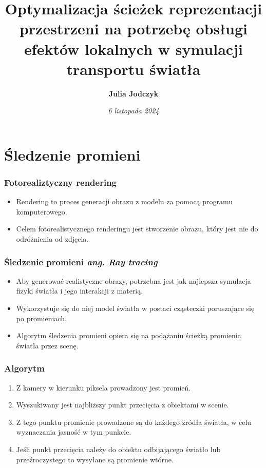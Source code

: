 \documentclass{beamer}
\title[ \insertframenumber/\inserttotalframenumber]{Optymalizacja ścieżek reprezentacji przestrzeni na potrzebę obsługi efektów lokalnych w symulacji transportu światła}
\author[Julia Jodczyk]{\textbf{Julia Jodczyk}}
\institute{Instytut Informatyki \\
dr inż. Łukasz Dąbała}
\date{\tiny{\emph{6 listopada 2024
}}}
\begin{document}
\frame{\titlepage}


\section{Śledzenie promieni}

\begin{frame}
\frametitle{Fotorealiztyczny rendering}
\begin{itemize}
    \item Rendering to proces generacji obrazu z modelu za pomocą programu komputerowego.
    \item Celem fotorealistycznego renderingu jest stworzenie obrazu, który jest nie do odróżnienia od zdjęcia.
\end{itemize}
\end{frame}

\begin{frame}
\frametitle{Śledzenie promieni \it{ang. Ray tracing}}
\begin{itemize}
    \item Aby generować realistyczne obrazy, potrzebna jest jak najlepsza symulacja fizyki światła i jego interakcji z materią.
    \item Wykorzystuje się do niej model światła w postaci cząsteczki poruszające się po promieniach.
    \item Algorytm śledzenia promieni opiera się na podążaniu ścieżką promienia światła przez scenę.
\end{itemize}
\end{frame}

\begin{frame}
\frametitle{Algorytm}
\begin{enumerate}
    \item Z kamery w kierunku piksela prowadzony jest promień.
    \item Wyszukiwany jest najbliższy punkt przecięcia z obiektami w scenie.
    \item Z tego punktu promienie prowadzone są do każdego źródła światła, w celu wyznaczania jasność w tym punkcie.
    \item Jeśli punkt przecięcia należy do obiektu odbijającego światło lub przeźroczystego to wysyłane są promienie wtórne.
\end{enumerate}
\end{frame}
\end{document}
